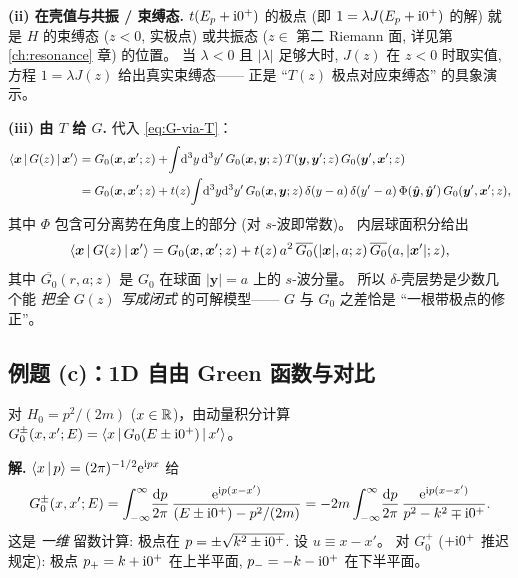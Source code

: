 \textbf{(ii) 在壳值与共振 / 束缚态.}
$t(E_p+\mathrm{i} 0^+)$ 的极点 (即 $1=\lambda J(E_p+\mathrm{i} 0^+)$ 的解)
就是 $H$ 的束缚态 ($z<0$, 实极点) 或共振态
($z\in$ 第二 Riemann 面, 详见第 \ref{ch:resonance} 章) 的位置。
当 $\lambda<0$ 且 $|\lambda|$ 足够大时, $J(z)$ 在 $z<0$ 时取实值,
方程 $1=\lambda J(z)$ 给出真实束缚态——
正是 ``$T(z)$ 极点对应束缚态'' 的具象演示。

\textbf{(iii) 由 $T$ 给 $G$.}
代入 \eqref{eq:G-via-T}：
\begin{align}
  \left\langle \bm x \,\middle|\, G(z) \,\middle|\, \bm x' \right\rangle
  &= G_0(\bm x,\bm x';z)
   + \!\int\!\mathrm{d}^3 y\,\mathrm{d}^3 y'\,
     G_0(\bm x,\bm y;z)\,T(\bm y,\bm y';z)\,G_0(\bm y',\bm x';z)\notag\\
  &= G_0(\bm x,\bm x';z)
   + t(z)\!\int\!\mathrm{d}^3 y\mathrm{d}^3 y'\,
     G_0(\bm x,\bm y;z)\,\delta(y-a)\,\delta(y'-a)
     \,\Phi(\hat{\bm y},\hat{\bm y}')\,G_0(\bm y',\bm x';z),
\end{align}
其中 $\Phi$ 包含可分离势在角度上的部分 (对 $s$-波即常数)。
内层球面积分给出
\begin{equation}
  \left\langle \bm x \,\middle|\, G(z) \,\middle|\, \bm x' \right\rangle
  = G_0(\bm x,\bm x';z)
  + t(z)\,a^2\,\overline{G_0}(|\bm x|,a;z)\,\overline{G_0}(a,|\bm x'|;z),
\end{equation}
其中 $\overline{G_0}(r,a;z)$ 是 $G_0$ 在球面 $|\bm y|=a$ 上的 $s$-波分量。
所以 $\delta$-壳层势是少数几个能 \emph{把全 $G(z)$ 写成闭式} 的可解模型——
$G$ 与 $G_0$ 之差恰是 ``一根带极点的修正''。

\subsection{例题 (c)：1D 自由 Green 函数与对比}

\begin{example}[1D 自由 Green 函数]\label{ex:G-1d}
对 $H_0=p^2/(2m)$ ($x\in\mathbb{R}$)，由动量积分计算
$G_0^\pm(x,x';E)=\left\langle x \,\middle|\, G_0(E\pm\mathrm{i} 0^+) \,\middle|\, x' \right\rangle$。
\end{example}

\textbf{解.}
$\left\langle x \,\middle|\, p \right\rangle=(2\pi)^{-1/2}\mathrm{e}^{\mathrm{i} px}$ 给
\begin{equation}\label{eq:G-1d-step1}
  G_0^\pm(x,x';E)
  = \int_{-\infty}^\infty\!\frac{\mathrm{d} p}{2\pi}\,
    \frac{\mathrm{e}^{\mathrm{i} p(x-x')}}{(E\pm\mathrm{i} 0^+)-p^2/(2m)}
  = -2m\int_{-\infty}^\infty\!\frac{\mathrm{d} p}{2\pi}\,
     \frac{\mathrm{e}^{\mathrm{i} p(x-x')}}{p^2-k^2\mp\mathrm{i} 0^+}.
\end{equation}
这是 \emph{一维} 留数计算: 极点在 $p=\pm\sqrt{k^2\pm\mathrm{i} 0^+}$.
设 $u\equiv x-x'$。
对 $G_0^+$ ($+\mathrm{i} 0^+$ 推迟规定): 极点 $p_+=k+\mathrm{i} 0^+$ 在上半平面,
$p_-=-k-\mathrm{i} 0^+$ 在下半平面。

